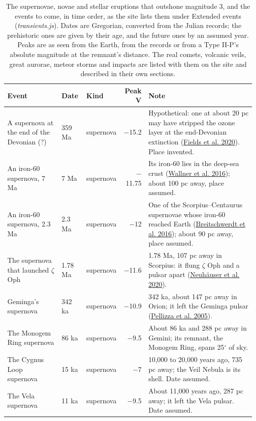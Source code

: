 \documentclass[9pt,twocolumn]{extarticle}
\begin{document}
\begin{table}[tp]\centering\scriptsize
\caption{The supernovae, novae and stellar eruptions that outshone magnitude 3, and the events to come, in time order, as the site lists them under Extended events (\emph{transients.js}). Dates are Gregorian, converted from the Julian records; the prehistoric ones are given by their age, and the future ones by an assumed year. Peaks are as seen from the Earth, from the records or from a Type II-P's absolute magnitude at the remnant's distance. The real comets, volcanic veils, great aurorae, meteor storms and impacts are listed with them on the site and described in their own sections.}\label{tab:transients}
\begin{tabularx}{\textwidth}{@{}p{3.6cm}p{1.6cm}lrY@{}}\toprule
Event & Date & Kind & Peak V & Note \\ \midrule
A supernova at the end of the Devonian (?) & 359 Ma & supernova & $-$15.2 & Hypothetical: one at about 20 pc may have stripped the ozone layer at the end-Devonian extinction (\protect\hyperlink{cite.fields2020}{Fields et al. 2020}). Place invented. \\
An iron-60 supernova, 7 Ma & 7 Ma & supernova & $-$11.75 & Its iron-60 lies in the deep-sea crust (\protect\hyperlink{cite.wallner2016}{Wallner et al. 2016}); about 100 pc away, place assumed. \\
An iron-60 supernova, 2.3 Ma & 2.3 Ma & supernova & $-$12 & One of the Scorpius--Centaurus supernovae whose iron-60 reached Earth (\protect\hyperlink{cite.breitschwerdt2016}{Breitschwerdt et al. 2016}); about 90 pc away, place assumed. \\
The supernova that launched $\zeta$ Oph & 1.78 Ma & supernova & $-$11.6 & 1.78 Ma, 107 pc away in Scorpius: it flung $\zeta$ Oph and a pulsar apart (\protect\hyperlink{cite.neuhauser2019}{Neuhäuser et al. 2020}). \\
Geminga's supernova & 342 ka & supernova & $-$10.9 & 342 ka, about 147 pc away in Orion; it left the Geminga pulsar (\protect\hyperlink{cite.pellizza2005}{Pellizza et al. 2005}). \\
The Monogem Ring supernova & 86 ka & supernova & $-$9.5 & About 86 ka and 288 pc away in Gemini; its remnant, the Monogem Ring, spans 25$^\circ$ of sky. \\
The Cygnus Loop supernova & 15 ka & supernova & $-$7 & 10,000 to 20,000 years ago, 735 pc away; the Veil Nebula is its shell. Date assumed. \\
The Vela supernova & 11 ka & supernova & $-$9.5 & About 11,000 years ago, 287 pc away; it left the Vela pulsar. Date assumed. \\

\end{tabularx}
\end{table}
\end{document}

